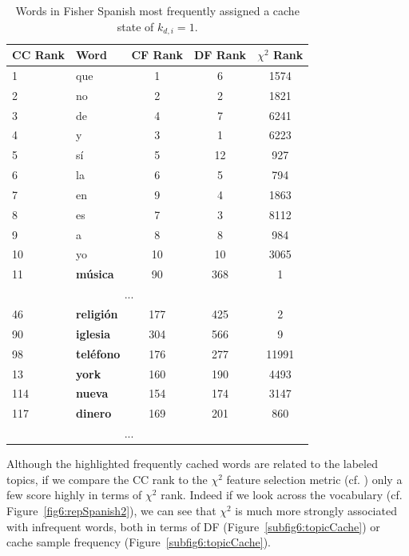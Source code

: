 \begin{table}
\begin{center}
\small
\begin{tabular}{l|lccc}
CC Rank & Word & CF Rank & DF Rank & $\chi^2$ Rank\\ \midrule
1 & que & 1 & 6 & 1574 \\
2 & no & 2 & 2 & 1821 \\
3 & de & 4 & 7 & 6241 \\
4 & y & 3 & 1 & 6223 \\
5 & sí & 5 & 12 & 927 \\
6 & la & 6 & 5 & 794 \\
7 & en & 9 & 4 & 1863 \\
8 & es & 7 & 3 & 8112 \\
9 & a & 8 & 8 & 984 \\
10 & yo & 10 & 10 & 3065\\
11 & \textbf{música} & 90 & 368 & 1 \\
\multicolumn{4}{c}{...} \\
46 & \textbf{religión} & 177 & 425 & 2 \\
90 & \textbf{iglesia} & 304 & 566 & 9 \\
98 & \textbf{teléfono} & 176 & 277 & 11991 \\
13 & \textbf{york} & 160 & 190 & 4493 \\
114 & \textbf{nueva} & 154 & 174 & 3147 \\
117 & \textbf{dinero} & 169 & 201 & 860 \\
\multicolumn{4}{c}{ ...} \\
\end{tabular}
\end{center}
\caption[Fisher Spanish words most frequently generated from cache]{Words in Fisher Spanish most frequently assigned a cache state of $k_{d,i}=1$. \label{fig6:fspWords}}
\end{table}


Although the highlighted frequently cached words are related to the labeled topics, if we compare the CC rank to the $\chi^2$ feature selection metric (cf. \cite{yang1997}) only a few score highly in terms of $\chi^2$ rank.  Indeed if we look across the vocabulary (cf. Figure~\ref{fig6:repSpanish2}), we can see that $\chi^2$ is much more strongly associated with infrequent words, both in terms of DF (Figure~\ref{subfig6:topicCache}) or cache sample frequency (Figure~\ref{subfig6:topicCache}).  


